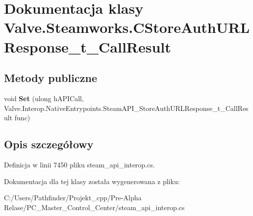 \hypertarget{class_valve_1_1_steamworks_1_1_c_store_auth_u_r_l_response__t___call_result}{}\section{Dokumentacja klasy Valve.\+Steamworks.\+C\+Store\+Auth\+U\+R\+L\+Response\+\_\+t\+\_\+\+Call\+Result}
\label{class_valve_1_1_steamworks_1_1_c_store_auth_u_r_l_response__t___call_result}
\subsection*{Metody publiczne}
\begin{DoxyCompactItemize}
\item 
\mbox{\label{class_valve_1_1_steamworks_1_1_c_store_auth_u_r_l_response__t___call_result_af7bb5a71ff0c3671157963576db3cd30}} 
void {\bfseries Set} (ulong h\+A\+P\+I\+Call, Valve.\+Interop.\+Native\+Entrypoints.\+Steam\+A\+P\+I\+\_\+\+Store\+Auth\+U\+R\+L\+Response\+\_\+t\+\_\+\+Call\+Result func)
\end{DoxyCompactItemize}


\subsection{Opis szczegółowy}


Definicja w linii 7450 pliku steam\+\_\+api\+\_\+interop.\+cs.



Dokumentacja dla tej klasy została wygenerowana z pliku\+:\begin{DoxyCompactItemize}
\item 
C\+:/\+Users/\+Pathfinder/\+Projekt\+\_\+cpp/\+Pre-\/\+Alpha Relase/\+P\+C\+\_\+\+Master\+\_\+\+Control\+\_\+\+Center/steam\+\_\+api\+\_\+interop.\+cs\end{DoxyCompactItemize}
